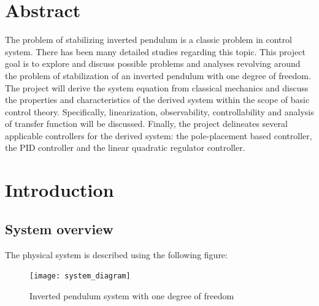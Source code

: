 \documentclass [12pt,letterpaper]{exam}
\begin{document}

\noindent
\section{Abstract}
The problem of stabilizing inverted pendulum is a classic problem in control system. There has been many detailed studies regarding this topic. This project goal is to explore and discuss possible problems and analyses revolving around the problem of stabilization of an inverted pendulum with one degree of freedom. The project will derive the system equation from classical mechanics and discuss the properties and characteristics of the derived system within the scope of basic control theory. Specifically, linearization, observability, controllability and analysis of transfer function will be discussed. Finally, the project delineates several applicable controllers for the derived system: the pole-placement based controller, the PID controller and the linear quadratic regulator controller.
\newpage

\section{Introduction}
\subsection{System overview}
The physical system is described using the following figure:
\begin{figure}[H]
  \centering
    \texttt{[image: system\_diagram]} 
  \caption{Inverted pendulum system with one degree of freedom}
  \label{fig:system_diagram}
\end{figure}
\end{document}
